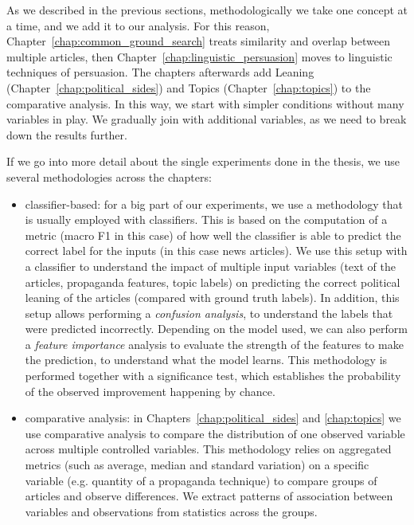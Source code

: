 As we described in the previous sections, methodologically we take one concept at a time, and we add it to our analysis. For this reason, Chapter~\ref{chap:common_ground_search} treats similarity and overlap between multiple articles, then Chapter~\ref{chap:linguistic_persuasion} moves to linguistic techniques of persuasion. The chapters afterwards add Leaning (Chapter~\ref{chap:political_sides}) and Topics (Chapter~\ref{chap:topics}) to the comparative analysis. In this way, we start with simpler conditions without many variables in play. We gradually join with additional variables, as we need to break down the results further.


If we go into more detail about the single experiments done in the thesis, we use several methodologies across the chapters:
\begin{itemize}
    \item classifier-based: for a big part of our experiments, we use a methodology that is usually employed with classifiers. This is based on the computation of a metric (macro F1 in this case) of how well the classifier is able to predict the correct label for the inputs (in this case news articles). We use this setup with a classifier to understand the impact of multiple input variables (text of the articles, propaganda features, topic labels) on predicting the correct political leaning of the articles (compared with ground truth labels).
    In addition, this setup allows performing a \emph{confusion analysis}, to understand the labels that were predicted incorrectly. Depending on the model used, we can also perform a \emph{feature importance} analysis to evaluate the strength of the features to make the prediction, to understand what the model learns. This methodology is performed together with a significance test, which establishes the probability of the observed improvement happening by chance.
    \item comparative analysis: in Chapters~\ref{chap:political_sides} and \ref{chap:topics} we use comparative analysis to compare the distribution of one observed variable across multiple controlled variables. This methodology relies on aggregated metrics (such as average, median and standard variation) on a specific variable (e.g. quantity of a propaganda technique) to compare groups of articles and observe differences. We extract patterns of association between variables and observations from statistics across the groups.
\end{itemize}



